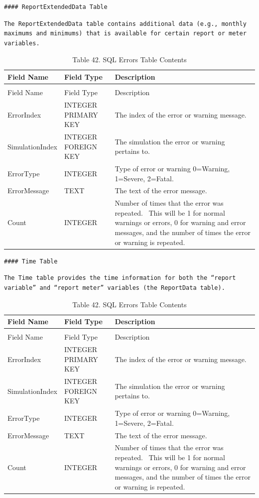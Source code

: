 \begin{lstlisting}
#### ReportExtendedData Table
\end{lstlisting}

\begin{lstlisting}
The ReportExtendedData table contains additional data (e.g., monthly maximums and minimums) that is available for certain report or meter variables.
\end{lstlisting}

\begin{longtable}[c]{p{1.5in}p{1.5in}p{2.99in}}
\caption{Table 42. SQL Errors Table Contents \label{table:table-42.-sql-errors-table-contents}} \tabularnewline
\toprule 
Field Name & Field Type & Description \tabularnewline
\midrule
\endfirsthead

\caption[]{Table 42. SQL Errors Table Contents} \tabularnewline
\toprule 
Field Name & Field Type & Description \tabularnewline
\midrule
\endhead

ErrorIndex & INTEGER PRIMARY KEY & The index of the error or warning message. \tabularnewline
SimulationIndex & INTEGER FOREIGN KEY & The simulation the error or warning pertains to. \tabularnewline
ErrorType & INTEGER & Type of error or warning 0=Warning, 1=Severe, 2=Fatal. \tabularnewline
ErrorMessage & TEXT & The text of the error message. \tabularnewline
Count & INTEGER & Number of times that the error was repeated.~ This will be 1 for normal warnings or errors, 0 for warning and error messages, and the number of times the error or warning is repeated. \tabularnewline
\bottomrule
\end{longtable}

\begin{lstlisting}
#### Time Table
\end{lstlisting}

\begin{lstlisting}
The Time table provides the time information for both the “report variable” and “report meter” variables (the ReportData table).
\end{lstlisting}

\begin{longtable}[c]{p{1.5in}p{1.5in}p{2.99in}}
\caption{Table 42. SQL Errors Table Contents \label{table:table-42.-sql-errors-table-contents}} \tabularnewline
\toprule 
Field Name & Field Type & Description \tabularnewline
\midrule
\endfirsthead

\caption[]{Table 42. SQL Errors Table Contents} \tabularnewline
\toprule 
Field Name & Field Type & Description \tabularnewline
\midrule
\endhead

ErrorIndex & INTEGER PRIMARY KEY & The index of the error or warning message. \tabularnewline
SimulationIndex & INTEGER FOREIGN KEY & The simulation the error or warning pertains to. \tabularnewline
ErrorType & INTEGER & Type of error or warning 0=Warning, 1=Severe, 2=Fatal. \tabularnewline
ErrorMessage & TEXT & The text of the error message. \tabularnewline
Count & INTEGER & Number of times that the error was repeated.~ This will be 1 for normal warnings or errors, 0 for warning and error messages, and the number of times the error or warning is repeated. \tabularnewline
\bottomrule
\end{longtable}

